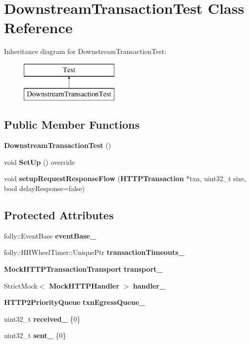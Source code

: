 \section{Downstream\+Transaction\+Test Class Reference}
\label{classDownstreamTransactionTest}
Inheritance diagram for Downstream\+Transaction\+Test\+:\begin{figure}[H]
\begin{center}
\leavevmode
\includegraphics[height=2.000000cm]{classDownstreamTransactionTest}
\end{center}
\end{figure}
\subsection*{Public Member Functions}
\begin{DoxyCompactItemize}
\item 
{\bf Downstream\+Transaction\+Test} ()
\item 
void {\bf Set\+Up} () override
\item 
void {\bf setup\+Request\+Response\+Flow} ({\bf H\+T\+T\+P\+Transaction} $\ast$txn, uint32\+\_\+t size, bool delay\+Response=false)
\end{DoxyCompactItemize}
\subsection*{Protected Attributes}
\begin{DoxyCompactItemize}
\item 
folly\+::\+Event\+Base {\bf event\+Base\+\_\+}
\item 
folly\+::\+H\+H\+Wheel\+Timer\+::\+Unique\+Ptr {\bf transaction\+Timeouts\+\_\+}
\item 
{\bf Mock\+H\+T\+T\+P\+Transaction\+Transport} {\bf transport\+\_\+}
\item 
Strict\+Mock$<$ {\bf Mock\+H\+T\+T\+P\+Handler} $>$ {\bf handler\+\_\+}
\item 
{\bf H\+T\+T\+P2\+Priority\+Queue} {\bf txn\+Egress\+Queue\+\_\+}
\item 
uint32\+\_\+t {\bf received\+\_\+} \{0\}
\item 
uint32\+\_\+t {\bf sent\+\_\+} \{0\}
\end{DoxyCompactItemize}


